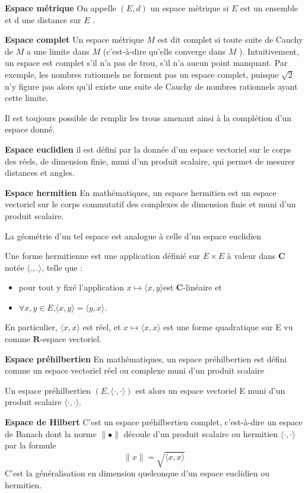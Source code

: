 \documentclass{book}
\begin{document}
\textbf{Espace m\'etrique}
On appelle $(E, d)$ un espace m\'etrique si $ E$  est un ensemble et d une distance sur $E$ .

\textbf{Espace complet}
Un espace m\'etrique $ M$  est dit complet si toute suite de Cauchy de $ M$  a une limite dans $ M$  (c'est-\`a-dire qu'elle converge dans $M$ ).\newline
Intuitivement, un espace est complet s'il n'a pas de trou, s'il n'a aucun point manquant. \newline
Par exemple, les nombres rationnels ne forment pas un espace complet,
puisque $\sqrt{2}$ n'y figure pas alors qu'il existe une suite de Cauchy de nombres rationnels ayant cette limite.

Il est toujours possible de remplir les trous amenant ainsi \`a la compl\'etion d'un espace donn\'e.

\textbf{Espace euclidien}
il est d\'efini par la donn\'ee d'un espace vectoriel sur le corps des r\'eels, de dimension finie, muni d'un produit scalaire,
qui permet de mesurer distances et angles.

\textbf{Espace hermitien}
En math\'ematiques, un espace hermitien est un espace vectoriel sur le corps commutatif des complexes de dimension finie et muni d'un produit scalaire.

La g\'eom\'etrie d'un tel espace est analogue \`a celle d'un espace euclidien

Une forme hermitienne est une application d\'efini\'e sur $E \times E$ \`a valeur dans $\mathbf{C}$ not\'ee $\langle .,.\rangle$, telle que :
\begin{itemize}
		\item pour tout y fix\'e l'application $x \mapsto \langle x,y\rangle $est $\mathbf{C}$-lin\'eaire et
		\item $\forall x,y \in E$,$\langle x,y\rangle=\overline{ \langle y,x\rangle}$.
\end{itemize}
En particulier, $\langle x,x\rangle$ est r\'eel, et $x\mapsto \langle x,x\rangle$ est une forme quadratique sur E vu comme $\mathbf{R}$-espace vectoriel.

\textbf{Espace pr\'ehilbertien}
En math\'ematiques, un espace pr\'ehilbertien est d\'efini comme un espace vectoriel r\'eel ou complexe muni d'un produit scalaire

Un espace pr\'ehilbertien $(E,\langle\cdot,\cdot\rangle)$ est alors un espace vectoriel E muni d'un produit scalaire $\langle\cdot,\cdot\rangle$.

\textbf{Espace de Hilbert}
C'est un espace pr\'ehilbertien complet, c'est-\`a-dire un espace de Banach dont
la norme $\parallel\bullet\parallel$ d\'ecoule d'un produit scalaire ou hermitien $\langle\cdot,\cdot\rangle$ par la formule
$$\parallel x\parallel = \sqrt{\langle x,x \rangle}$$
C'est la g\'en\'eralisation en dimension quelconque d'un espace euclidien ou hermitien.
\bigskip
\end{document}
